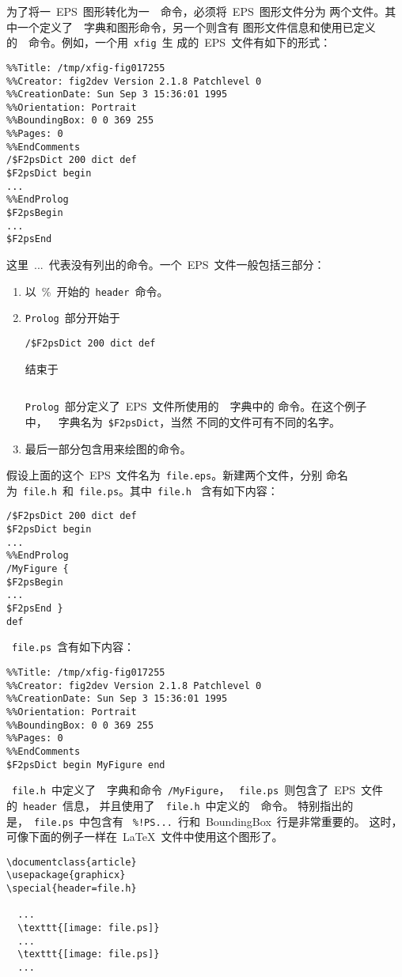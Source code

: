 为了将一~EPS~图形转化为一~\PS~命令，必须将~EPS~图形文件分为
两个文件。其中一个定义了~\PS~字典和图形命令，另一个则含有
图形文件信息和使用已定义的~\PS~命令。例如，一个用~\texttt{xfig}~生
成的~EPS~文件有如下的形式：
\begin{Verbatim}[xleftmargin=1cm]
%!PS-Adobe-2.0 EPSF-2.0
%%Title: /tmp/xfig-fig017255
%%Creator: fig2dev Version 2.1.8 Patchlevel 0
%%CreationDate: Sun Sep 3 15:36:01 1995
%%Orientation: Portrait
%%BoundingBox: 0 0 369 255
%%Pages: 0
%%EndComments
/$F2psDict 200 dict def
$F2psDict begin
...
%%EndProlog
$F2psBegin
...
$F2psEnd
\end{Verbatim}
这里~...~代表没有列出的命令。一个~EPS~文件一般包括三部分：
\begin{enumerate}
\item 以~\%~开始的~\texttt{header}~命令。
\item \texttt{Prolog}~部分开始于
      \begin{Verbatim}[xleftmargin=1cm]
      /$F2psDict 200 dict def
      \end{Verbatim}
      结束于
      \begin{Verbatim}[xleftmargin=1cm]
      %%EndProlog
      \end{Verbatim}
      \texttt{Prolog}~部分定义了~EPS~文件所使用的~\PS~字典中的
      命令。在这个例子中，~\PS~字典名为~\texttt{\$F2psDict}，当然
      不同的文件可有不同的名字。
\item 最后一部分包含用来绘图的命令。
\end{enumerate}

假设上面的这个~EPS~文件名为~\texttt{file.eps}。新建两个文件，分别
命名为~\texttt{file.h}~和~\texttt{file.ps}。其中~\texttt{file.h}~
含有如下内容：
\begin{Verbatim}[xleftmargin=1cm]
/$F2psDict 200 dict def
$F2psDict begin
...
%%EndProlog
/MyFigure {
$F2psBegin
...
$F2psEnd }
def
\end{Verbatim}
~\texttt{file.ps}~含有如下内容：
\begin{Verbatim}[xleftmargin=1cm]
%!PS-Adobe-2.0 EPSF-2.0
%%Title: /tmp/xfig-fig017255
%%Creator: fig2dev Version 2.1.8 Patchlevel 0
%%CreationDate: Sun Sep 3 15:36:01 1995
%%Orientation: Portrait
%%BoundingBox: 0 0 369 255
%%Pages: 0
%%EndComments
$F2psDict begin MyFigure end
\end{Verbatim}

~\texttt{file.h}~中定义了~\PS~字典和命令~\texttt{/MyFigure}，
~\texttt{file.ps}~则包含了~EPS~文件的~\texttt{header}~信息，
并且使用了~~\texttt{file.h}~中定义的~\PS~命令。
特别指出的是，~\texttt{file.ps}~中包含有
~\texttt{\%!PS...}~行和~BoundingBox~行是非常重要的。
这时，可像下面的例子一样在~\LaTeX{}~文件中使用这个图形了。
\begin{Verbatim}[xleftmargin=1cm]
\documentclass{article}
\usepackage{graphicx}
\special{header=file.h}

  ...
  \texttt{[image: file.ps]}
  ...
  \texttt{[image: file.ps]}
  ...

\end{Verbatim}

